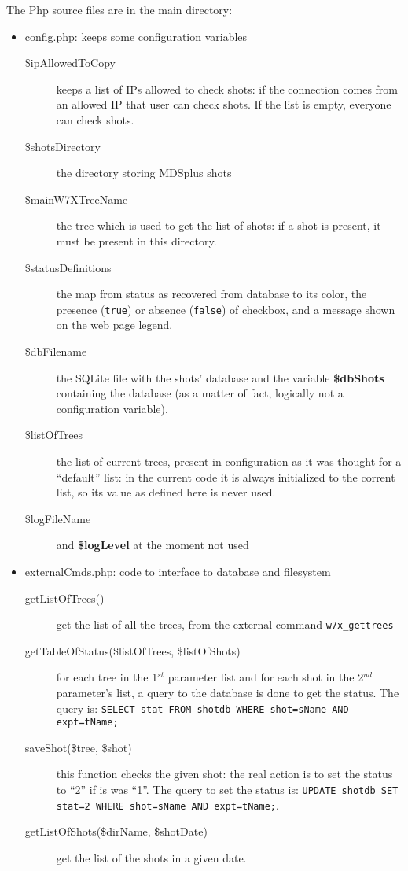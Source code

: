 \documentclass[12pt]{article}
\begin{document}
The Php source files are in the main directory:
\begin{itemize}
\item config.php: keeps some configuration variables
\begin{description}
\item[\$ipAllowedToCopy] keeps a list of IPs allowed to check shots: 
  if the connection comes from an allowed IP that user can check shots.
  If the list is empty, everyone can check shots.
\item[\$shotsDirectory] the directory storing MDSplus shots
\item[\$mainW7XTreeName] the tree which is used to get the list of shots: 
  if a shot is present, it must be present in this directory.
\item[\$statusDefinitions] the map from status as recovered from database to
  its color, the presence (\texttt{true}) or absence (\texttt{false}) of checkbox,
  and a message shown on the web page legend.
\item[\$dbFilename] the SQLite file with the shots' database and the variable \textbf{\$dbShots}
  containing the database (as a matter of fact, logically not a configuration variable).
\item[\$listOfTrees] the list of current trees, present in configuration as it
  was thought for a ``default'' list: in the current code it is always initialized 
  to the corrent list, so its value as defined here is never used.
\item[\$logFileName] and \textbf{\$logLevel} at the moment not used
\end{description}

\item externalCmds.php: code to interface to database and filesystem
\begin{description}
\item[getListOfTrees()] get the list of all the trees, from the external command \texttt{w7x\_gettrees}
\item[getTableOfStatus(\$listOfTrees, \$listOfShots)] for each tree in the 1$^{st}$ parameter list
  and for each shot in the 2$^{nd}$ parameter's list, a query to the database is done to get the status.
  The query is: \texttt{SELECT stat FROM shotdb WHERE shot=sName AND expt=tName;}
\item[saveShot(\$tree, \$shot)] this function checks the given shot: the real action is
  to set the status to ``2'' if is was ``1''. The query to set the status is: \texttt{UPDATE shotdb SET stat=2 WHERE shot=sName AND expt=tName;}.
\item[getListOfShots(\$dirName, \$shotDate)] get the list of the shots in a given date.
\end{description}


\end{itemize}
\end{document}
